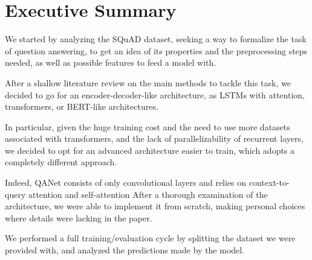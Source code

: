 \chapter{Executive Summary}
		We started by analyzing the SQuAD dataset\cite{DBLP:journals/corr/RajpurkarZLL16}, seeking a way to formalize the task of question answering, 
	to get an idea of its properties and the preprocessing steps needed, as well as possible features to feed a model with.

	After a shallow literature review on the main methods to tackle this task, we decided to go for an encoder-decoder-like architecture, as 
	LSTMs with attention\cite{seo2018bidirectional}, transformers\cite{vaswani2017attention}, or BERT\cite{devlin2019bert}-like architectures.

	In particular, given the huge training cost and the need to use more datasets associated with transformers, and the lack of parallelizability 
	of recurrent layers, we decided to opt for an advanced architecture easier to train, which adopts a completely different approach.
	
	Indeed, QANet\cite{yu2018qanet} consists of only convolutional layers and relies on context-to-query attention and self-attention\cite{vaswani2017attention}
	After a thorough examination of the architecture, we were able to implement it from scratch, making personal choices where details were lacking in the paper.
	
	We performed a full training/evaluation cycle by splitting the dataset we were provided with, and analyzed the predictions made by the model.
